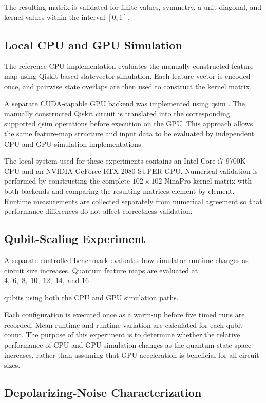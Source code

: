 \documentclass[pdflatex,sn-mathphys-num]{sn-jnl}%
\theoremstyle{thmstyleone}%
\theoremstyle{thmstyletwo}%
\theoremstyle{thmstylethree}%
\begin{document}
The resulting matrix is validated for finite values, symmetry, a unit diagonal,
and kernel values within the interval $[0,1]$.


\subsection{Local CPU and GPU Simulation}\label{subsec:cpu-gpu}

The reference CPU implementation evaluates the manually constructed feature map
using Qiskit-based statevector simulation. Each feature vector is encoded once,
and pairwise state overlaps are then used to construct the kernel matrix.

A separate CUDA-capable GPU backend was implemented using qsim
\cite{qsim}. The manually constructed Qiskit circuit is translated into the
corresponding supported qsim operations before execution on the GPU. This
approach allows the same feature-map structure and input data to be evaluated by
independent CPU and GPU simulation implementations.

The local system used for these experiments contains an Intel Core i7-9700K CPU
and an NVIDIA GeForce RTX 2080 SUPER GPU. Numerical validation is performed by
constructing the complete $102\times102$ NinaPro kernel matrix with both
backends and comparing the resulting matrices element by element. Runtime
measurements are collected separately from numerical agreement so that
performance differences do not affect correctness validation.


\subsection{Qubit-Scaling Experiment}\label{subsec:qubit-scaling}

A separate controlled benchmark evaluates how simulator runtime changes as
circuit size increases. Quantum feature maps are evaluated at \(4,\;6,\;8,\;10,\;12,\;14,\;\text{and }16\)

qubits using both the CPU and GPU simulation paths.

Each configuration is executed once as a warm-up before five timed runs are
recorded. Mean runtime and runtime variation are calculated for each qubit count.
The purpose of this experiment is to determine whether the relative performance
of CPU and GPU simulation changes as the quantum state space increases, rather
than assuming that GPU acceleration is beneficial for all circuit sizes.


\subsection{Depolarizing-Noise Characterization}
\label{subsec:noise-method}
\end{document}
